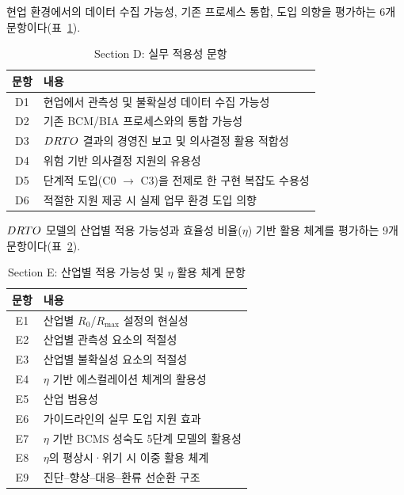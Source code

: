 \label{app:survey-d}

현업 환경에서의 데이터 수집 가능성, 기존 프로세스 통합, 도입 의향을 평가하는 6개 문항이다(\p{[}표~\ref{tab:app-survey-items-d}\p{]}).

\begin{table}[htbp]
\centering
\caption{Section D: 실무 적용성 문항}
\label{tab:app-survey-items-d}
\small
\begin{tabularx}{\textwidth}{cX}
\toprule
\textbf{문항} & \textbf{내용} \\
\midrule
D1 & 현업에서 관측성 및 불확실성 데이터 수집 가능성 \\
D2 & 기존 BCM/BIA 프로세스와의 통합 가능성 \\
D3 & $DRTO$ 결과의 경영진 보고 및 의사결정 활용 적합성 \\
D4 & 위험 기반 의사결정 지원의 유용성 \\
D5 & 단계적 도입(C0 $\to$ C3)을 전제로 한 구현 복잡도 수용성 \\
D6 & 적절한 지원 제공 시 실제 업무 환경 도입 의향 \\
\bottomrule
\end{tabularx}
\end{table}

\label{app:survey-e}

{$DRTO$ 모델의 산업별 적용 가능성과 효율성 비율($\eta$) 기반 활용 체계를 평가하는
9개 문항이다(\p{[}표~\ref{tab:app-survey-items-e}\p{]}).}

\begin{table}[htbp]
\centering
\caption{Section E: 산업별 적용 가능성 및 $\eta$ 활용 체계 문항}
\label{tab:app-survey-items-e}
\small
\begin{tabularx}{\textwidth}{cX}
\toprule
\textbf{문항} & \textbf{내용} \\
\midrule
{E1} & {산업별 $R_0$/$R_{\max}$ 설정의 현실성} \\
{E2} & {산업별 관측성 요소의 적절성} \\
{E3} & {산업별 불확실성 요소의 적절성} \\
{E4} & {$\eta$ 기반 에스컬레이션 체계의 활용성} \\
{E5} & {산업 범용성} \\
{E6} & {가이드라인의 실무 도입 지원 효과} \\
{E7} & {$\eta$ 기반 BCMS 성숙도 5단계 모델의 활용성} \\
{E8} & {$\eta$의 평상시·위기 시 이중 활용 체계} \\
{E9} & {진단--향상--대응--환류 선순환 구조} \\
\bottomrule
\end{tabularx}
\end{table}

